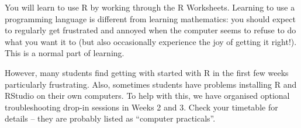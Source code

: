 \documentclass[
  a4paper,
]{book}
\theoremstyle{definition}
\theoremstyle{definition}
\theoremstyle{definition}
\theoremstyle{definition}
\theoremstyle{remark}
\begin{document}
You will learn to use R by working through the R Worksheets. Learning to use a programming language is different from learning mathematics: you should expect to regularly get frustrated and annoyed when the computer seems to refuse to do what you want it to (but also occasionally experience the joy of getting it right!). This is a normal part of learning.

However, many students find getting with started with R in the first few weeks particularly frustrating. Also, sometimes students have problems installing R and RStudio on their own computers. To help with this, we have organised optional troubleshooting drop-in sessions in Weeks 2 and 3. Check your timetable for details -- they are probably listed as ``computer practicals''.
\end{document}
